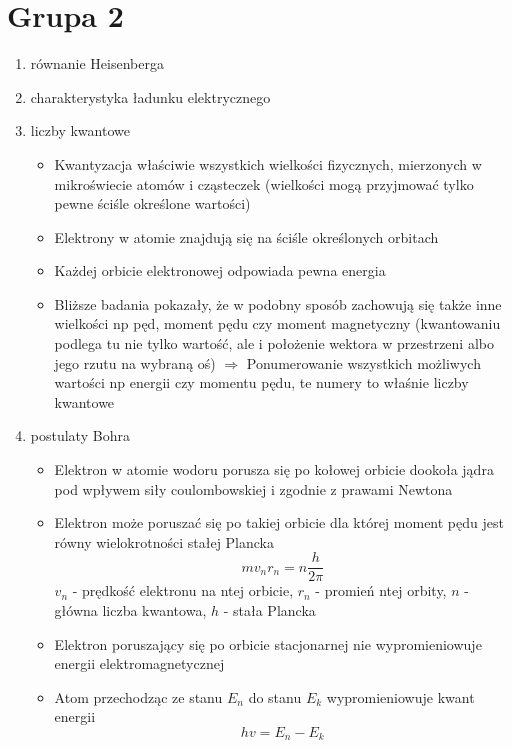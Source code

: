 \documentclass[12pt,a4paper]{article}
\begin{document}
\section{Grupa 2}

\begin {enumerate}

\item równanie Heisenberga

\item charakterystyka ładunku elektrycznego

\item liczby kwantowe

 \begin{itemize}
 	\item Kwantyzacja właściwie wszystkich wielkości fizycznych, mierzonych w mikroświecie atomów i cząsteczek (wielkości mogą przyjmować tylko pewne ściśle określone wartości)
 	\item Elektrony w atomie znajdują się na ściśle określonych orbitach
 	\item Każdej orbicie elektronowej odpowiada pewna energia
 	\item Bliższe badania pokazały, że w podobny sposób zachowują się także inne wielkości np pęd, moment pędu czy moment magnetyczny (kwantowaniu podlega tu nie tylko wartość, ale i położenie wektora w przestrzeni albo jego rzutu na wybraną oś) $\Rightarrow$ Ponumerowanie wszystkich możliwych wartości np energii czy momentu pędu, te numery to właśnie liczby kwantowe
 \end{itemize}

\item postulaty Bohra

 \begin{itemize}
 	\item Elektron w atomie wodoru porusza się po kołowej orbicie dookoła jądra pod wpływem siły coulombowskiej i zgodnie z prawami Newtona
 	\item Elektron może poruszać się po takiej orbicie dla której moment pędu jest równy wielokrotności stałej Plancka
 	$$mv_nr_n=n\frac{h}{2\pi}$$
 	$v_n$ - prędkość elektronu na ntej orbicie, $r_n$ - promień ntej orbity, $n$ - główna liczba kwantowa, $h$ - stała Plancka
 	\item Elektron poruszający się po orbicie stacjonarnej nie wypromieniowuje energii elektromagnetycznej
 	\item Atom przechodząc ze stanu $E_n$ do stanu $E_k$ wypromieniowuje kwant energii
 	$$hv = E_n-E_k$$
 \end{itemize}


\end{enumerate}
\end{document}
